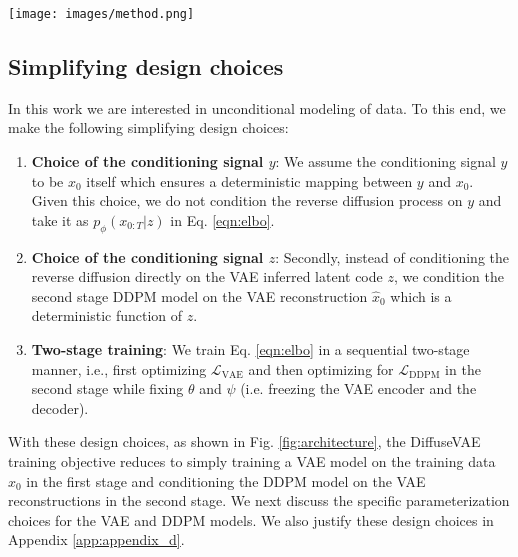 \documentclass[10pt]{article} \usepackage[accepted]{tmlr}
\begin{document}
\begin{figure*}
  \centering
  \texttt{[image: images/method.png]}
    \caption{Proposed DiffuseVAE generative process under the simplifying design choices discussed in Section ~\ref{subsec:design_choices}. DiffuseVAE is trained in a two-stage manner: The VAE encoder takes the original image $x_0$ as input and generates a reconstruction $\hat{x}_0$ which is used to condition the second stage DDPM.}
    \label{fig:architecture}
\end{figure*}

\subsection{Simplifying design choices}
\label{subsec:design_choices}
In this work we are interested in unconditional modeling of data. To this end, we make the following simplifying design choices:

\begin{enumerate}
    \item \textbf{Choice of the conditioning signal $y$}: We assume the conditioning signal $y$ to be $x_0$ itself which ensures a deterministic mapping between $y$ and $x_0$. Given this choice, we do not condition the reverse diffusion process on $y$ and take it as $p_{\phi}(x_{0:T}|z)$ in Eq. \ref{eqn:elbo}.
    
    \item \textbf{Choice of the conditioning signal $z$}: Secondly, instead of conditioning the reverse diffusion directly on the VAE inferred latent code $z$, we condition the second stage DDPM model on the VAE reconstruction $\hat{x}_0$ which is a deterministic function of $z$. 


    \item \textbf{Two-stage training}: We train Eq. \ref{eqn:elbo} in a sequential two-stage manner, i.e., first optimizing $\mathcal{L}_{\text{VAE}}$ and then optimizing for $\mathcal{L}_{\text{DDPM}}$ in the second stage while fixing $\theta$ and $\psi$ (i.e. freezing the VAE encoder and the decoder).
\end{enumerate}

With these design choices, as shown in Fig. \ref{fig:architecture}, the DiffuseVAE training objective reduces to simply training a VAE model on the training data $x_0$ in the first stage and conditioning the DDPM model on the VAE reconstructions in the second stage. We next discuss the specific parameterization choices for the VAE and DDPM models. We also justify these design choices in Appendix \ref{app:appendix_d}.
\end{document}
